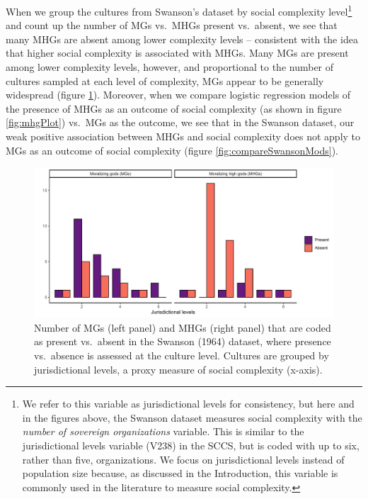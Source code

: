 \documentclass[
]{article}
\begin{document}
When we group the cultures from Swanson's dataset by social complexity level\footnote{We refer to this variable as jurisdictional levels for consistency, but here and in the figures above, the Swanson dataset measures social complexity with the \emph{number of sovereign organizations} variable. This is similar to the jurisdictional levels variable (V238) in the SCCS, but is coded with up to six, rather than five, organizations. We focus on jurisdictional levels instead of population size because, as discussed in the Introduction, this variable is commonly used in the literature to measure social complexity.} and count up the number of MGs vs.~MHGs present vs.~absent, we see that many MHGs are absent among lower complexity levels -- consistent with the idea that higher social complexity is associated with MHGs. Many MGs are present among lower complexity levels, however, and proportional to the number of cultures sampled at each level of complexity, MGs appear to be generally widespread (figure \ref{fig:compareSwanson}). Moreover, when we compare logistic regression models of the presence of MHGs as an outcome of social complexity (as shown in figure \ref{fig:mhgPlot}) vs.~MGs as the outcome, we see that in the Swanson dataset, our weak positive association between MHGs and social complexity does not apply to MGs as an outcome of social complexity (figure \ref{fig:compareSwansonMods}).

\begin{figure}
\centering
\includegraphics{mhg-writeup_files/figure-latex/compareSwanson-1.pdf}
\caption{\label{fig:compareSwanson}Number of MGs (left panel) and MHGs (right panel) that are coded as present vs.~absent in the Swanson (1964) dataset, where presence vs.~absence is assessed at the culture level. Cultures are grouped by jurisdictional levels, a proxy measure of social complexity (x-axis).}
\end{figure}
\end{document}

